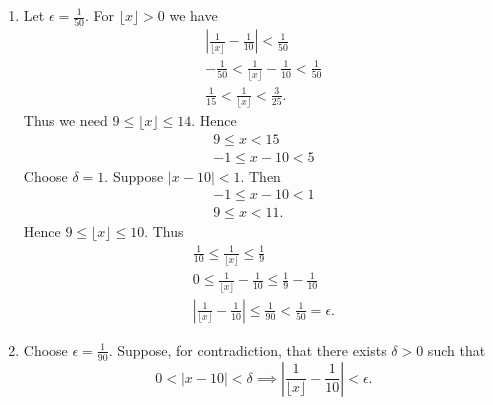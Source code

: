 \documentclass[12pt]{article}
\begin{document}
\begin{enumerate}[label=(\alph*)]
          Suppose \( \vert x - 10 \vert < 8\). Then
          \[
              \begin{split}
                  -8 < x - 10 < 8 \\
                  2 < x < 18.
              \end{split}
          \]
          Thus, \( \lfloor x \rfloor  \geq  2\), so
          \[
              0 < \frac{1}{\lfloor x \rfloor } \leq \frac{1}{2}.
          \]
          Moreover
          \[
              -\frac{1}{10} < \frac{1}{\lfloor x \rfloor } - \frac{1}{10} < \frac{2}{5}.
          \]
          Therefore,
          \[
              \vert \frac{1}{\lfloor x \rfloor } - \frac{1}{10} \vert < \frac{1}{2} =\epsilon.
          \]
    \item Let \( \epsilon = \frac{1}{50} \). For \( \lfloor x \rfloor > 0 \) we have
          \[
              \begin{split}
                  \left\vert \frac{1}{\lfloor x \rfloor} - \frac{1}{10} \right\vert < \frac{1}{50} \\
                  -\frac{1}{50} < \frac{1}{\lfloor x \rfloor} - \frac{1}{10} < \frac{1}{50}        \\
                  \frac{1}{15} < \frac{1}{\lfloor x \rfloor} < \frac{3}{25}.
              \end{split}
          \]
          Thus we need \( 9 \leq \lfloor x \rfloor \leq 14 \). Hence
          \[
              \begin{split}
                  9 \leq x < 15 \\
                  -1 \leq x - 10 < 5
              \end{split}
          \]
          Choose \( \delta = 1 \). Suppose \( \vert x -10 \vert < 1 \). Then
          \[
              \begin{split}
                  -1 \leq x - 10 < 1 \\
                  9 \leq x < 11.
              \end{split}
          \]
          Hence \( 9 \leq \lfloor x \rfloor \leq 10 \). Thus
          \[
              \begin{split}
                  \frac{1}{10} \leq \frac{1}{\lfloor x \rfloor} \leq \frac{1}{9}                    \\
                  0 \leq \frac{1}{\lfloor x \rfloor} - \frac{1}{10} \leq \frac{1}{9} - \frac{1}{10} \\
                  \left\vert \frac{1}{\lfloor x \rfloor} - \frac{1}{10} \right\vert \leq \frac{1}{90} < \frac{1}{50} = \epsilon.
              \end{split}
          \]
    \item Choose \( \epsilon = \frac{1}{90} \). Suppose, for contradiction, that there exists \(\delta>0\) such that
          \[
              0<|x-10|<\delta
              \implies
              \left|\frac{1}{\lfloor x\rfloor}-\frac{1}{10}\right|<\epsilon.
          \]


\end{enumerate}
\end{document}
